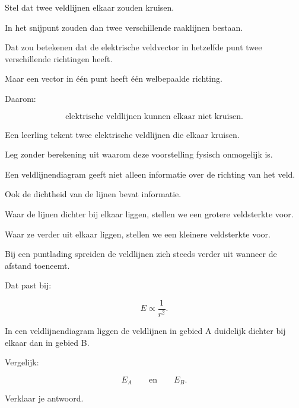 \documentclass{ximera}
\begin{document}


Stel dat twee veldlijnen elkaar zouden kruisen.

In het snijpunt zouden dan twee verschillende raaklijnen bestaan.

Dat zou betekenen dat de elektrische veldvector in hetzelfde punt twee
verschillende richtingen heeft.

Maar een vector in één punt heeft één welbepaalde richting.

Daarom:

\[
\boxed{
\text{elektrische veldlijnen kunnen elkaar niet kruisen}.
}
\]


\begin{oefening}{\oefU\ESS}

Een leerling tekent twee elektrische veldlijnen die elkaar kruisen.

Leg zonder berekening uit waarom deze voorstelling fysisch onmogelijk
is.

\end{oefening}




Een veldlijnendiagram geeft niet alleen informatie over de richting
van het veld.

Ook de dichtheid van de lijnen bevat informatie.

Waar de lijnen dichter bij elkaar liggen, stellen we een grotere
veldsterkte voor.

Waar ze verder uit elkaar liggen, stellen we een kleinere
veldsterkte voor.

Bij een puntlading spreiden de veldlijnen zich steeds verder uit
wanneer de afstand toeneemt.

Dat past bij:

\[
E\propto\frac{1}{r^2}.
\]


\begin{oefening}{\oefB\ESS}

In een veldlijnendiagram liggen de veldlijnen in gebied A duidelijk
dichter bij elkaar dan in gebied B.

Vergelijk:

\[
E_A
\qquad\text{en}\qquad
E_B.
\]

Verklaar je antwoord.

\end{oefening}
\end{document}
